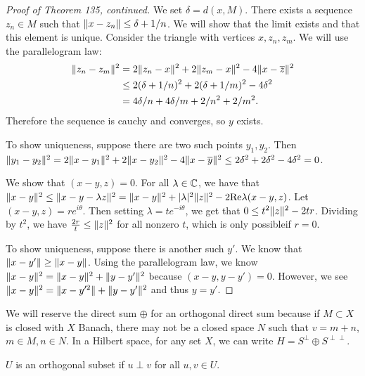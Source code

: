 \documentclass[10pt, twoside]{article}
\begin{document}
    \begin{proof}[Proof of Theorem 135, continued] We set $\delta = d(x,M)$.
        There exists a sequence $z_n \in M$ such that $\lVert x-z_n\rVert \leq \delta
        + 1/n$. We will show that the limit exists and that this element is
        unique. Consider the triangle with vertices $x, z_n, z_m$. We will use
        the parallelogram law: \begin{align*} \lVert z_n-z_m\rVert^2 &= 2
        \lVert z_n-x\rVert^2 + 2\lVert z_m-x\rVert^2 - 4\lVert x-\overline{z}\rVert^2 \\ &\leq 2
    (\delta + 1/n)^2 + 2 (\delta+1/m)^2 - 4 \delta^2 \\ &= 4 \delta/n + 4
\delta/m + 2/n^2 + 2/m^2.  \end{align*} Therefore the sequence is cauchy and
converges, so $y$ exists.

        To show uniqueness, suppose there are two such points $y_1, y_2$. Then
        $\lVert y_1-y_2\rVert^2 = 2 \lVert x-y_1\rVert^2 + 2 \lVert x-y_2\rVert^2 -
        4\lVert x-\overline{y}\rVert^2 \leq 2 \delta^2 + 2 \delta^2 - 4 \delta^2 =
        0$.

        We show that $(x-y,z) = 0$. For all $\lambda \in \mathbb{C}$, we have that
        $\lVert x-y\rVert^2 \leq \lVert x-y-\lambda z\rVert^2 = \lVert x-y\rVert^2 +
        \lvert\lambda\rvert^2 \lVert z\rVert^2 - 2 \mathrm{Re} \lambda (x-y,z)$. Let
        $(x-y,z) = re^{i\theta}$. Then setting $\lambda = te^{-i\theta}$, we
        get that $0 \leq t^2\lVert z\rVert^2 - 2tr$. Dividing by $t^2$, we have
        $\frac{2r}{t} \leq \lVert z\rVert^2$ for all nonzero $t$, which is only
        possibleif $r=0$.

        To show uniqueness, suppose there is another such $y'$. We know that
    $\lVert x-y'\rVert \geq \lVert x-y\rVert$. Using the parallelogram law, we know
$\lVert x-y\rVert^2 = \lVert x-y\rVert^2 + \lVert y-y'\rVert^2$ because $(x-y, y-y') = 0$.
However, we see $\lVert x-y\rVert^2 = \lVert x-y'^2\rVert + \lVert y-y'\rVert^2$ and thus $y=y'$.
        \end{proof}
    
    \begin{rmk} We will reserve the direct sum $\oplus$ for an orthogonal
        direct sum because if $M \subset X$ is closed with $X$ Banach, there
        may not be a closed space $N$ such that $v=m+n$, $m \in M, n \in N$. In
        a Hilbert space, for any set $X$, we can write $H = S^{\perp} \oplus
        S^{\perp\perp}$.  \end{rmk}

    \begin{defn} $U$ is an orthogonal subset if $u \perp v$
    for all $u,v \in U$.  \end{defn}
\end{document}
